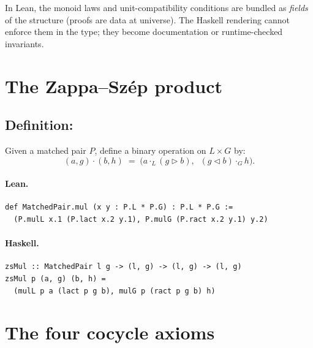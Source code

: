 \documentclass[11pt,a4paper]{article}
\begin{document}
\begin{fidelitynote}
In Lean, the monoid laws and unit-compatibility conditions are bundled as
\emph{fields} of the structure (proofs are data at  universe).
The Haskell rendering cannot enforce them in the type; they become documentation
or runtime-checked invariants.
\end{fidelitynote}


\section{The Zappa--Sz\'{e}p product}

\subsection{Definition: }

\begin{defn}
Given a matched pair $P$, define a binary operation on $L \times G$ by:
\[
  (a, g) \cdot (b, h)
  \;=\;
  \bigl(a \cdot_L (g \triangleright b),\;\; (g \triangleleft b) \cdot_G h\bigr).
\]
\end{defn}

\paragraph{Lean.}
\begin{lstlisting}[style=lean]
def MatchedPair.mul (x y : P.L * P.G) : P.L * P.G :=
  (P.mulL x.1 (P.lact x.2 y.1), P.mulG (P.ract x.2 y.1) y.2)
\end{lstlisting}

\paragraph{Haskell.}
\begin{lstlisting}[style=haskell]
zsMul :: MatchedPair l g -> (l, g) -> (l, g) -> (l, g)
zsMul p (a, g) (b, h) =
  (mulL p a (lact p g b), mulG p (ract p g b) h)
\end{lstlisting}


\section{The four cocycle axioms}
\end{document}
